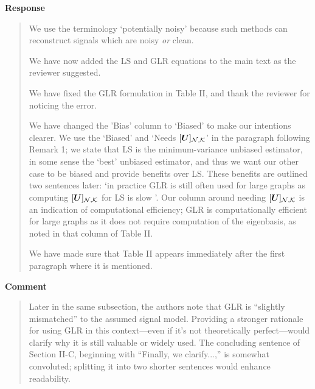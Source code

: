 \documentclass[11pt,onecolumn,journal]{IEEEtran}
\newcommand{\matr}[1]{\bm{#1}}
\theoremstyle{definition}
\newcommand{\set}[1]{\mathcal{#1}}
\newcommand{\matrsubU}[1]{\matrsub[#1, K]{U}}
\begin{document}
\textbf{Response}
\begin{quote}
We use the terminology `potentially noisy' because such methods can reconstruct signals which are noisy \emph{or} clean.

We have now added the LS and GLR equations to the main text as the reviewer suggested.

We have fixed the GLR formulation in Table II, and thank the reviewer for noticing the error.

We have changed the 'Bias' column to `Biased' to make our intentions clearer. We use the `Biased' and `Needs $\matrsubU{N}$' in the paragraph following Remark 1; we state that LS is the minimum-variance unbiased estimator, in some sense the `best' unbiased estimator, and thus we want our other case to be biased and provide benefits over LS. These benefits are outlined two sentences later: `in practice GLR is still often used for large graphs as computing $\matrsubU{N}$ for LS is slow \cite{puy2018random, bai2020fast}'. Our column around needing $\matrsubU{N}$ is an indication of computational efficiency; GLR is computationally efficient for large graphs as it does not require computation of the eigenbasis, as noted in that column of Table II.

We have made sure that Table II appears immediately after the first paragraph where it is mentioned.
\end{quote}

\textbf{Comment}
\begin{quote}
Later in the same subsection, the authors note that GLR is “slightly mismatched” to the assumed signal model. Providing a stronger rationale for using GLR in this context—even if it’s not theoretically perfect—would clarify why it is still valuable or widely used. The concluding sentence of Section II-C, beginning with “Finally, we clarify...,” is somewhat convoluted; splitting it into two shorter sentences would enhance readability.
\end{quote}
\end{document}
